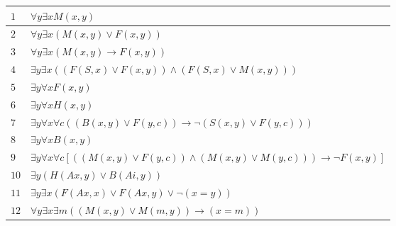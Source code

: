 \documentclass[a4paper,12pt]{article}
\begin{document}
\begin{tcolorbox}
\begin{table}[H]
    \centering
    \begin{tabular}{*2{l}}
    $1$ & $\forall y \exists x M(x,y)$  \\
    \hline 
    $2$ & $\forall y \exists x (M(x,y)\vee F(x,y))$  \\
    \hline
    $3$ & $\forall y \exists x (M(x,y)\rightarrow
    F(x,y))$ \\
    \hline
    $4$ & $\exists y \exists x ((F(S,x) \vee F(x,y)) \wedge (F(S,x) \vee M(x,y)))$  \\
    \hline
    $5$ & $ \exists y \forall x F(x,y)$ \\
    \hline
    $6$ & $\exists y \forall x H(x,y)$ \\
    \hline
    $7$ & $\exists y \forall x \forall c ((B(x,y) \vee F(y,c)) \rightarrow \neg(S(x,y) \vee F(y,c)))$ \\
    \hline
    $8$ & $\exists y \forall x B(x,y)$ \\
    \hline
    $9$ & $\exists y \forall x \forall c [((M(x,y) \vee F(y,c)) \wedge (M(x,y) \vee M(y,c))) \rightarrow \neg F(x,y)]$ \\
    \hline
    $10$ & $\exists y (H(Ax,y) \vee B(Ai,y))$\\
    \hline
    $11$ & $ \exists y \exists x (F(Ax,x) \vee F(Ax,y) \vee \neg(x=y))$ \\
    \hline
    $12$ & $\forall y \exists x \exists m ((M(x,y) \vee M(m,y)) \rightarrow (x=m))$
    \end{tabular}
\end{table}

\end{tcolorbox}


\newpage
\end{document}

